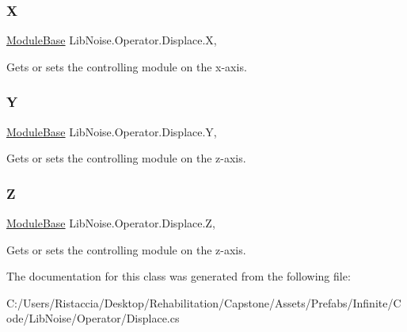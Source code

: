 \subsubsection{\texorpdfstring{X}{X}}
{\footnotesize\ttfamily \hyperlink{class_lib_noise_1_1_module_base}{Module\+Base} Lib\+Noise.\+Operator.\+Displace.\+X\hspace{0.3cm}{\ttfamily [get]}, {\ttfamily [set]}}



Gets or sets the controlling module on the x-\/axis. 

\mbox{\label{class_lib_noise_1_1_operator_1_1_displace_a1da92f5c8dff7e3981d2d110b81b7e76}} 
\subsubsection{\texorpdfstring{Y}{Y}}
{\footnotesize\ttfamily \hyperlink{class_lib_noise_1_1_module_base}{Module\+Base} Lib\+Noise.\+Operator.\+Displace.\+Y\hspace{0.3cm}{\ttfamily [get]}, {\ttfamily [set]}}



Gets or sets the controlling module on the z-\/axis. 

\mbox{\label{class_lib_noise_1_1_operator_1_1_displace_a1854a6666dc802dfe47a9728da11b994}} 
\subsubsection{\texorpdfstring{Z}{Z}}
{\footnotesize\ttfamily \hyperlink{class_lib_noise_1_1_module_base}{Module\+Base} Lib\+Noise.\+Operator.\+Displace.\+Z\hspace{0.3cm}{\ttfamily [get]}, {\ttfamily [set]}}



Gets or sets the controlling module on the z-\/axis. 



The documentation for this class was generated from the following file\+:\begin{DoxyCompactItemize}
\item 
C\+:/\+Users/\+Ristaccia/\+Desktop/\+Rehabilitation/\+Capstone/\+Assets/\+Prefabs/\+Infinite/\+Code/\+Lib\+Noise/\+Operator/Displace.\+cs\end{DoxyCompactItemize}
